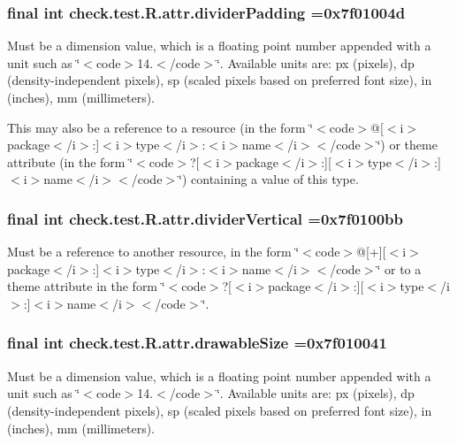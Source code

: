 \subsubsection[{divider\+Padding}]{\setlength{\rightskip}{0pt plus 5cm}final int check.\+test.\+R.\+attr.\+divider\+Padding =0x7f01004d\hspace{0.3cm}{\ttfamily [static]}}\label{classcheck_1_1test_1_1_r_1_1attr_a9f8b7dc92e7e2974335ab3d696aa83cf}
Must be a dimension value, which is a floating point number appended with a unit such as \char`\"{}$<$code$>$14.\+5sp$<$/code$>$\char`\"{}. Available units are\+: px (pixels), dp (density-\/independent pixels), sp (scaled pixels based on preferred font size), in (inches), mm (millimeters). 

This may also be a reference to a resource (in the form \char`\"{}$<$code$>$@\mbox{[}$<$i$>$package$<$/i$>$\+:\mbox{]}$<$i$>$type$<$/i$>$\+:$<$i$>$name$<$/i$>$$<$/code$>$\char`\"{}) or theme attribute (in the form \char`\"{}$<$code$>$?\mbox{[}$<$i$>$package$<$/i$>$\+:\mbox{]}\mbox{[}$<$i$>$type$<$/i$>$\+:\mbox{]}$<$i$>$name$<$/i$>$$<$/code$>$\char`\"{}) containing a value of this type. \hypertarget{classcheck_1_1test_1_1_r_1_1attr_a64fcf0c48c0723bf9361cd965752e00e}{}
\subsubsection[{divider\+Vertical}]{\setlength{\rightskip}{0pt plus 5cm}final int check.\+test.\+R.\+attr.\+divider\+Vertical =0x7f0100bb\hspace{0.3cm}{\ttfamily [static]}}\label{classcheck_1_1test_1_1_r_1_1attr_a64fcf0c48c0723bf9361cd965752e00e}
Must be a reference to another resource, in the form \char`\"{}$<$code$>$@\mbox{[}+\mbox{]}\mbox{[}$<$i$>$package$<$/i$>$\+:\mbox{]}$<$i$>$type$<$/i$>$\+:$<$i$>$name$<$/i$>$$<$/code$>$\char`\"{} or to a theme attribute in the form \char`\"{}$<$code$>$?\mbox{[}$<$i$>$package$<$/i$>$\+:\mbox{]}\mbox{[}$<$i$>$type$<$/i$>$\+:\mbox{]}$<$i$>$name$<$/i$>$$<$/code$>$\char`\"{}. \hypertarget{classcheck_1_1test_1_1_r_1_1attr_a3acddaeb5712641317db75c95a7011af}{}
\subsubsection[{drawable\+Size}]{\setlength{\rightskip}{0pt plus 5cm}final int check.\+test.\+R.\+attr.\+drawable\+Size =0x7f010041\hspace{0.3cm}{\ttfamily [static]}}\label{classcheck_1_1test_1_1_r_1_1attr_a3acddaeb5712641317db75c95a7011af}
Must be a dimension value, which is a floating point number appended with a unit such as \char`\"{}$<$code$>$14.\+5sp$<$/code$>$\char`\"{}. Available units are\+: px (pixels), dp (density-\/independent pixels), sp (scaled pixels based on preferred font size), in (inches), mm (millimeters). 

